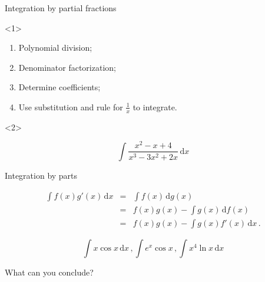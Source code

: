 \begin{frame}{Integration by partial fractions}

\begin{onlyenv}<1>

\begin{enumerate}
\item Polynomial division;
\item Denominator factorization;
\item Determine coefficients;
\item Use \alert{substitution} and rule for $\frac{1}{x}$ to integrate.
\end{enumerate}
\end{onlyenv}



\begin{onlyenv}<2>

\begin{example}
\[
\int\frac{x^{2}-x+4}{x^{3}-3x^{2}+2x}\,\mathrm{d}x
\]

\end{example}

\end{onlyenv}

\end{frame}

\begin{frame}{Integration by parts}


\begin{eqnarray*}
\int f\left(x\right)g'\left(x\right)\,\mathrm{d}x & = & \int f\left(x\right)\,\mathrm{d}g\left(x\right)\\
 & = & f\left(x\right)g\left(x\right)-\int g\left(x\right)\,\mathrm{d}f\left(x\right)\\
 & = & f\left(x\right)g\left(x\right)-\int g\left(x\right)f'\left(x\right)\,\mathrm{d}x\,.
\end{eqnarray*}



\pause{}
\begin{example}
\[
\int x\cos x\,\mathrm{d}x\,,\int e^{x}\cos x\,,\int x^{4}\ln x\,\mathrm{d}x
\]

\end{example}


\pause{}


What can you conclude?

\end{frame}

